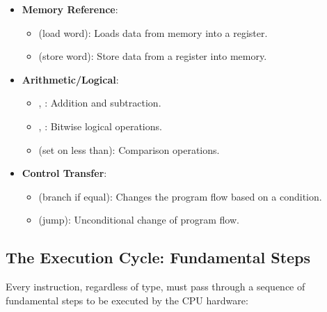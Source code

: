 \begin{itemize}
    \item \textbf{Memory Reference}:
          \begin{itemize}
              \item {} (load word): Loads data from memory into a register.
              \item {} (store word): Store data from a register into memory.
          \end{itemize}

    \item \textbf{Arithmetic/Logical}:
          \begin{itemize}
              \item {}, : Addition and subtraction.
              \item {}, : Bitwise logical operations.
              \item {} (set on less than): Comparison operations.
          \end{itemize}

    \item \textbf{Control Transfer}:
          \begin{itemize}
              \item {} (branch if equal): Changes the program flow based on a condition.
              \item {} (jump): Unconditional change of program flow.
          \end{itemize}
\end{itemize}

\subsection{The Execution Cycle: Fundamental Steps}
Every instruction, regardless of type, must pass through a sequence of
fundamental steps to be executed by the CPU hardware:


